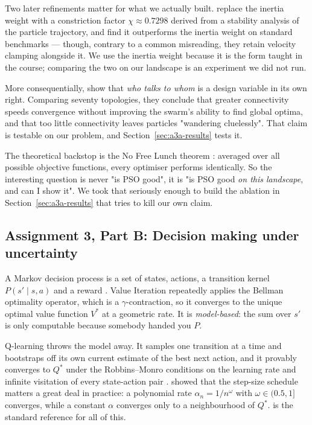 \documentclass{ai-lab-report}
\begin{document}
Two later refinements matter for what we actually built. \citet{clerc2002particle} replace the
inertia weight with a constriction factor $\chi \approx 0.7298$ derived from a stability analysis
of the particle trajectory, and \citet{eberhart2000comparing} find it outperforms the inertia
weight on standard benchmarks --- though, contrary to a common misreading, they retain velocity
clamping alongside it. We use the inertia weight because it is the form taught in the course;
comparing the two on our landscape is an experiment we did not run.

More consequentially, \citet{kennedy2002population} show that \emph{who talks to whom} is a
design variable in its own right. Comparing seventy topologies, they conclude that greater
connectivity speeds convergence without improving the swarm's ability to find global optima, and
that too little connectivity leaves particles "wandering cluelessly". That claim is testable on
our problem, and Section~\ref{sec:a3a-results} tests it.

The theoretical backstop is the No Free Lunch theorem \citep{wolpert1997nfl}: averaged over
all possible objective functions, every optimiser performs identically. So the interesting
question is never "is PSO good", it is "is PSO good \emph{on this landscape}, and can I
show it". We took that seriously enough to build the ablation in
Section~\ref{sec:a3a-results} that tries to kill our own claim.

\subsection{Assignment 3, Part B: Decision making under uncertainty}
A Markov decision process is a set of states, actions, a transition kernel $P(s'\mid s,a)$
and a reward \citep{bellman1957mdp, howard1960dp}. Value Iteration repeatedly applies the
Bellman optimality operator, which is a $\gamma$-contraction, so it converges to the unique
optimal value function $V^*$ at a geometric rate. It is \emph{model-based}: the sum over
$s'$ is only computable because somebody handed you $P$.

Q-learning \citep{watkins1989thesis, watkins1992qlearning} throws the model away. It samples
one transition at a time and bootstraps off its own current estimate of the best next action,
and it provably converges to $Q^*$ under the Robbins--Monro conditions on the learning rate
and infinite visitation of every state-action pair
\citep{jaakkola1994convergence, tsitsiklis1994async}. \citet{evendar2003rates} showed that the
step-size schedule matters a great deal in practice: a polynomial rate $\alpha_n = 1/n^{\omega}$
with $\omega \in (0.5, 1]$ converges, while a constant $\alpha$ converges only to a
neighbourhood of $Q^*$. \citet{sutton2018rl} is the standard reference for all of this.
\end{document}
